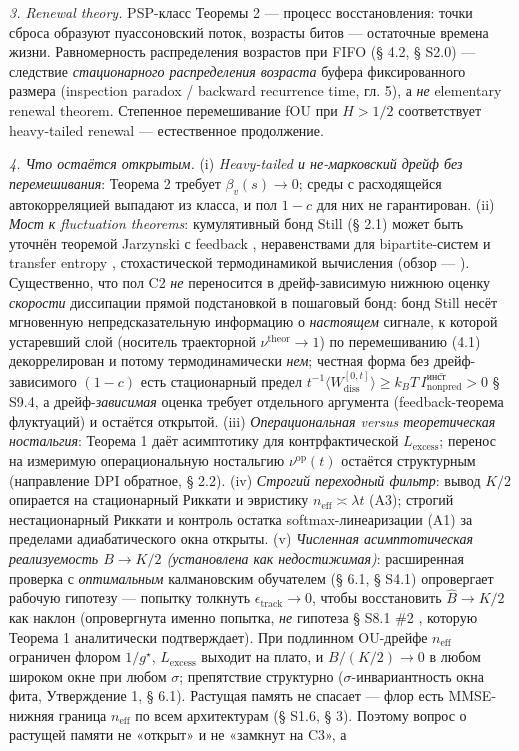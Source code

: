 \documentclass[12pt]{iopart}
\begin{document}
\emph{3. Renewal theory.} PSP-класс Теоремы 2 --- процесс восстановления: точки сброса образуют пуассоновский поток, возрасты битов --- остаточные времена жизни. Равномерность распределения возрастов при FIFO (§ 4.2, § S2.0) --- следствие \emph{стационарного распределения возраста} буфера фиксированного размера (inspection paradox / backward recurrence time, \cite{Cox1962} гл. 5), а \emph{не} elementary renewal theorem. Степенное перемешивание fOU при \(H > 1/2\) соответствует heavy-tailed renewal --- естественное продолжение.



\emph{4. Что остаётся открытым.} (i) \emph{Heavy-tailed и не-марковский дрейф без перемешивания}: Теорема 2 требует \(\beta_v(s) \to 0\); среды с расходящейся автокорреляцией выпадают из класса, и пол \(1-c\) для них не гарантирован. (ii) \emph{Мост к fluctuation theorems}: кумулятивный бонд Still (§ 2.1) может быть уточнён теоремой Jarzynski с feedback \cite{SagawaUeda2010}, неравенствами для bipartite-систем и transfer entropy \cite{HartichBaratoSeifert2014}, стохастической термодинамикой вычисления \cite{Wolpert2019} (обзор --- \cite{Parrondo2015}). Существенно, что пол C2 \emph{не} переносится в дрейф-зависимую нижнюю оценку \emph{скорости} диссипации прямой подстановкой в пошаговый бонд: бонд Still несёт мгновенную непредсказательную информацию о \emph{настоящем} сигнале, к которой устаревший слой (носитель траекторной \(\nu^{\text{theor}}\to1\)) по перемешиванию (4.1) декоррелирован и потому термодинамически \emph{нем}; честная форма без дрейф-зависимого \((1-c)\) есть стационарный предел \(t^{-1}\langle W_{\text{diss}}^{[0,t]}\rangle \ge k_B T\,\overline{I_{\text{nonpred}}^{\text{инст}}} > 0\) \cite{Andriishin2026b} § S9.4, а дрейф-\emph{зависимая} оценка требует отдельного аргумента (feedback-теорема флуктуаций) и остаётся открытой. (iii) \emph{Операциональная versus теоретическая ностальгия}: Теорема 1 даёт асимптотику для контрфактической \(L_{\text{excess}}\); перенос на измеримую операциональную ностальгию \(\nu^{\text{op}}(t)\) остаётся структурным (направление DPI обратное, § 2.2). (iv) \emph{Строгий переходный фильтр}: вывод \(K/2\) опирается на стационарный Риккати и эвристику \(n_{\text{eff}} \asymp \lambda t\) (A3); строгий нестационарный Риккати и контроль остатка softmax-линеаризации (A1) за пределами адиабатического окна открыты. (v) \emph{Численная асимптотическая реализуемость \(B \to K/2\) (установлена как недостижимая)}: расширенная проверка с \emph{оптимальным} калмановским обучателем (§ 6.1, § S4.1) опровергает рабочую гипотезу --- попытку толкнуть \(\epsilon_{\text{track}} \to 0\), чтобы восстановить \(\hat B \to K/2\) как наклон (опровергнута именно попытка, \emph{не} гипотеза § S8.1 \#2 \cite{Andriishin2026b}, которую Теорема 1 аналитически подтверждает). При подлинном OU-дрейфе \(n_{\text{eff}}\) ограничен флором \(1/g^\star\), \(L_{\text{excess}}\) выходит на плато, и \(B/(K/2) \to 0\) в любом широком окне при любом \(\sigma\); препятствие структурно (\(\sigma\)-инвариантность окна фита, Утверждение 1, § 6.1). Растущая память не спасает --- флор есть MMSE-нижняя граница \(n_{\text{eff}}\) по всем архитектурам (§ S1.6, § 3). Поэтому вопрос о растущей памяти не «открыт» и не «замкнут на C3», а 
\end{document}

